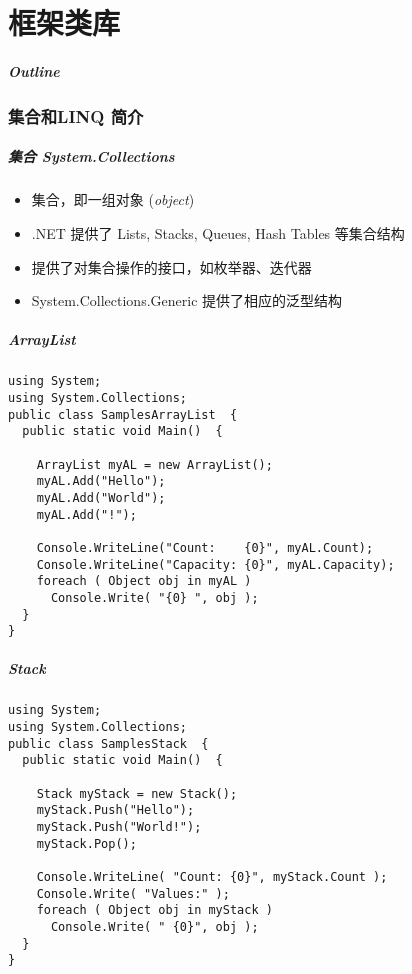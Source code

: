 
\part{框架类库}
\begin{frame}
\frametitle{Outline}            %
\tableofcontents
\end{frame}

\section{集合和LINQ 简介}

\begin{frame}
\frametitle{集合 System.Collections}

\begin{itemize}
\setlength{\itemsep}{8pt plus 1pt}
\item 集合，即一组对象 (\textit{object})
\item .NET 提供了 Lists, Stacks, Queues, Hash Tables 等集合结构
\item 提供了对集合操作的接口，如枚举器、迭代器
\item System.Collections.Generic 提供了相应的泛型结构
\end{itemize}

\end{frame}

\begin{frame}[fragile]
\frametitle{ArrayList}
\begin{lstlisting}
using System;
using System.Collections;
public class SamplesArrayList  {
  public static void Main()  {

    ArrayList myAL = new ArrayList();
    myAL.Add("Hello");
    myAL.Add("World");
    myAL.Add("!");

    Console.WriteLine("Count:    {0}", myAL.Count);
    Console.WriteLine("Capacity: {0}", myAL.Capacity);
    foreach ( Object obj in myAL )
      Console.Write( "{0} ", obj );
  }
}
\end{lstlisting}
\end{frame}

\begin{frame}[fragile]
\frametitle{Stack}
\begin{lstlisting}
using System;
using System.Collections;
public class SamplesStack  {
  public static void Main()  {

    Stack myStack = new Stack();
    myStack.Push("Hello");
    myStack.Push("World!");
    myStack.Pop();

    Console.WriteLine( "Count: {0}", myStack.Count );
    Console.Write( "Values:" );
    foreach ( Object obj in myStack )
      Console.Write( " {0}", obj );
  }
}
\end{lstlisting}
\end{frame}


